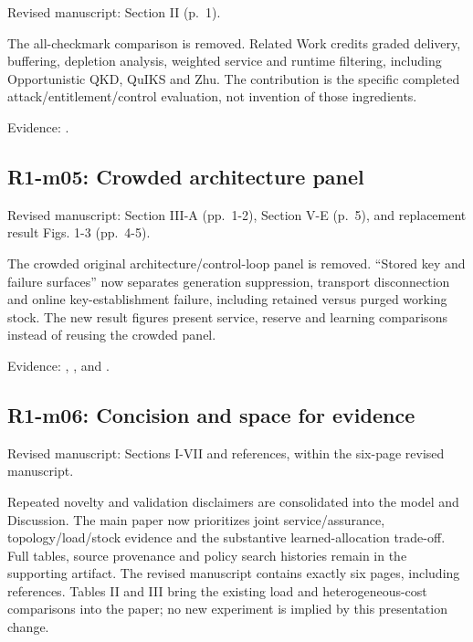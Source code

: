 \documentclass[a4paper,11pt]{article}
\begin{document}
Revised manuscript: Section II (p.~1).

The all-checkmark comparison is removed. Related Work credits graded delivery, buffering, depletion analysis, weighted service and runtime filtering, including Opportunistic QKD, QuIKS and Zhu. The contribution is the specific completed attack/entitlement/control evaluation, not invention of those ingredients.

Evidence: .

\subsection{R1-m05: Crowded architecture panel}\label{r1-m05-crowded-architecture-panel}

Revised manuscript: Section III-A (pp.~1-2), Section V-E (p.~5), and replacement result Figs. 1-3 (pp.~4-5).

The crowded original architecture/control-loop panel is removed. ``Stored key and failure surfaces'' now separates generation suppression, transport disconnection and online key-establishment failure, including retained versus purged working stock. The new result figures present service, reserve and learning comparisons instead of reusing the crowded panel.

Evidence: , , and .

\subsection{R1-m06: Concision and space for evidence}\label{r1-m06-concision-and-space-for-evidence}

Revised manuscript: Sections I-VII and references, within the six-page revised manuscript.

Repeated novelty and validation disclaimers are consolidated into the model and Discussion. The main paper now prioritizes joint service/assurance, topology/load/stock evidence and the substantive learned-allocation trade-off. Full tables, source provenance and policy search histories remain in the supporting artifact. The revised manuscript contains exactly six pages, including references. Tables II and III bring the existing load and heterogeneous-cost comparisons into the paper; no new experiment is implied by this presentation change.
\end{document}

